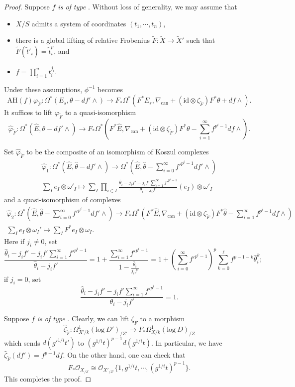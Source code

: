\documentclass[12pt, a4paper]{article}
\begin{document}
\begin{proof}
Suppose {\itshape $f$ is of type \uppercase\expandafter{}}. Without loss of generality, we may assume that 
\begin{itemize}
\item[(i)\ ] $X/S$ admits a system of coordinates $(t_1,\cdots,t_n)$,
\item[(ii)\ ] there is a global lifting of relative Frobenius $\tilde F:\tilde X\to\tilde X'$ such that $\tilde F(\tilde t'_i)=\tilde t_i^p$, and
\item[(iii)\ ] $f=\prod_{i=1}^nt_i^{j_i}$.
\end{itemize}
Under these assumptions, $\phi^{-1}$ becomes
$$\mathrm{AH}(f)\varphi_{\tilde F}:\Omega^*(E_s,\theta-df'\wedge)\to F_*\Omega^*(F^*E_s,\nabla_\mathrm{can}+(\mathrm{id}\otimes\zeta_{\tilde F})F^*\theta+df\wedge).$$
It suffices to lift $\varphi_{\tilde F}$ to a quasi-isomorphism
$$
\hat\varphi_{\tilde F}:\Omega^*(\hat E,\theta-df'\wedge)\to F_*\Omega^*(F^*\hat E,\nabla_\mathrm{can}+(\mathrm{id}\otimes\zeta_{\tilde F})F^*\theta-\sum_{i=1}^\infty f^{p^i-1}df\wedge).
$$

Set $\hat\varphi_{\tilde F}$ to be the composite of an isomorphism of Koszul complexes 
$$
\begin{array}{c}
\hat\varphi_1:\Omega^*(\hat E,\hat\theta-df'\wedge)\to\Omega^*(\hat E,\hat\theta-\sum_{i=0}^\infty f'^{p^i-1}df'\wedge)\\
\sum_I e_I\otimes\omega'_I\mapsto\sum_I\prod_{i\in I}\frac{\hat\theta_i-j_if'-j_if'\sum_{i=1}^\infty f'^{p^i-1}}{\theta_i-j_if'}(e_I)\otimes\omega'_I
\end{array}
$$
and a quasi-isomorphism of complexes
$$
\begin{array}{c}
\hat\varphi_2:\Omega^*(\hat E,\hat\theta-\sum_{i=0}^\infty f'^{p^i-1}df'\wedge)\to F_*\Omega^*(F^*\hat E,\nabla_\mathrm{can}+(\mathrm{id}\otimes\zeta_{\tilde F})F^*\hat\theta-\sum_{i=1}^\infty f^{p^i-1}df\wedge)\\
\sum_Ie_I\otimes\omega_I'\mapsto\sum_IF^*e_I\otimes\omega_I.
\end{array}
$$
Here if $j_i\neq0$, set
$$
\frac{\hat\theta_i-j_if'-j_if'\sum_{i=1}^\infty f'^{p^i-1}}{\hat\theta_i-j_if'}=1+\frac{\sum_{i=1}^\infty f'^{p^i-1}}{1-\frac{\hat\theta_i}{j_if'}}=1+(\sum_{i=0}^\infty f'^{p^i-1})^p\sum_{k=0}^\ell f^{p-1-k}\hat\theta_i^k;
$$
if $j_i=0$, set
$$
\frac{\hat\theta_i-j_if'-j_if'\sum_{i=1}^\infty f'^{p^i-1}}{\theta_i-j_if'}=1.$$

Suppose {\itshape $f$ is of type \uppercase\expandafter{}}. Clearly, we can lift $\zeta_{\tilde F}$ to a morphism
$$
\hat\zeta_{\tilde F}:\Omega_{X'/k}^1(\mathrm{log}~D')_{/Z'}\to F_*\Omega^1_{X/k}(\mathrm{log}~D)_{/Z}
$$
which sends $d(g'^{1/i}t')$ to $(g^{1/i}t)^{p-1}d(g^{1/i}t)$. In particular, we have $\hat\zeta_{\tilde F}(df')=f^{p-1}df$. On the other hand, one can check that
$$
F_*\mathcal O_{X_{/Z}}\cong\mathcal O_{X'_{/Z'}}\{1,g^{1/i}t,\cdots,(g^{1/i}t)^{p-1}\}.
$$
This completes the proof.
\end{proof}
\fi
\end{document}
